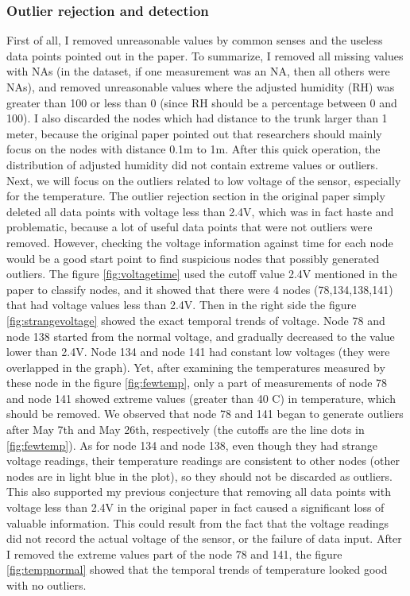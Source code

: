 \documentclass[11pt]{article}
\begin{document}
{\subsubsection{Outlier rejection and detection}
First of all, I removed unreasonable values by common senses and the useless data points pointed out in the paper. To summarize, I removed all missing values with NAs (in the dataset, if one measurement was an NA, then all others were NAs), and removed unreasonable values where the adjusted humidity (RH) was greater than 100 or less than 0 (since RH should be a percentage between 0 and 100). I also discarded the nodes which had distance to the trunk larger than 1 meter, because the original paper pointed out that researchers should mainly focus on the nodes with distance 0.1m to 1m. After this quick operation, the distribution of adjusted humidity did not contain extreme values or outliers.\\
Next, we will focus on the outliers related to low voltage of the sensor, especially for the temperature. The outlier rejection section in the original paper simply deleted all data points with voltage less than 2.4V, which was in fact haste and problematic, because a lot of useful data points that were not outliers were removed. However, checking the voltage information against time for each node would be a good start point to find suspicious nodes that possibly generated outliers. The figure \ref{fig:voltagetime} used the cutoff value 2.4V mentioned in the paper to classify nodes, and it showed that there were 4 nodes (78,134,138,141) that had voltage values less than 2.4V. Then in the right side the figure \ref{fig:strangevoltage} showed the exact temporal trends of voltage. Node 78 and node 138 started from the normal voltage, and gradually decreased to the value lower than 2.4V. Node 134 and node 141 had constant low voltages (they were overlapped in the graph). Yet, after examining the temperatures measured by these node in the figure \ref{fig:fewtemp}, only a part of measurements of node 78 and node 141 showed extreme values (greater than 40 C) in temperature, which should be removed. We observed that node 78 and 141 began to generate outliers after May 7th and May 26th, respectively (the cutoffs are the line dots in \ref{fig:fewtemp}). As for node 134 and node 138, even though they had strange voltage readings, their temperature readings are consistent to other nodes (other nodes are in light blue in the plot), so they should not be discarded as outliers. This also supported my previous conjecture that removing all data points with voltage less than 2.4V in the original paper in fact caused a significant loss of valuable information. This could result from the fact that the voltage readings did not record the actual voltage of the sensor, or the failure of data input. After I removed the extreme values part of the node 78 and 141, the figure \ref{fig:tempnormal} showed that the temporal trends of temperature looked good with no outliers.\\
}
\end{document}
